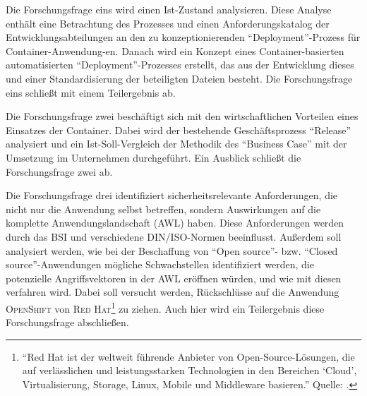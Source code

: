 Die Forschungsfrage eins wird einen Ist-Zustand analysieren. Diese Analyse enthält eine Betrachtung des Prozesses und einen Anforderungskatalog der Entwicklungsabteilungen an den zu konzeptionierenden \enquote{Deployment}-Prozess für Container-Anwendung-en. Danach wird ein Konzept eines Container-basierten automatisierten \enquote{Deployment}-Prozesses erstellt, das aus der Entwicklung dieses und einer Standardisierung der beteiligten Dateien besteht. Die Forschungsfrage eins schließt mit einem Teilergebnis ab. \par
Die Forschungsfrage zwei beschäftigt sich mit den wirtschaftlichen Vorteilen eines Einsatzes der Container. Dabei wird der bestehende Geschäftsprozess \enquote{Release} analysiert und ein Ist-Soll-Vergleich der Methodik des \enquote{Business Case} mit der Umsetzung im Unternehmen durchgeführt. Ein Ausblick schließt die Forschungsfrage zwei ab. 
\par
Die Forschungsfrage drei identifiziert sicherheitsrelevante Anforderungen, die nicht nur die Anwendung selbst betreffen, sondern Auswirkungen auf die komplette Anwendungslandschaft (\acs{AWL}) haben. Diese Anforderungen werden durch das \ac{BSI} und verschiedene \textsc{DIN/ISO}-Normen beeinflusst. Außerdem soll analysiert werden, wie bei der Beschaffung von \enquote{Open source}- bzw. \enquote{Closed source}-Anwendungen mögliche Schwachstellen identifiziert werden, die potenzielle Angriffsvektoren in der \ac{AWL} eröffnen würden, und wie mit diesen verfahren wird. Dabei soll versucht werden, Rückschlüsse auf die Anwendung \textsc{OpenShift} von \textsc{Red Hat\footnote{\enquote{Red Hat ist der weltweit führende Anbieter von Open-Source-Lösungen, die auf verlässlichen und leistungsstarken Technologien in den Bereichen \enquote{Cloud}, Virtualisierung, Storage, Linux, Mobile und Middleware basieren.} Quelle: \cite[][]{red_hat_inc_red_2020}.}} zu ziehen. Auch hier wird ein Teilergebnis diese Forschungsfrage abschließen.


